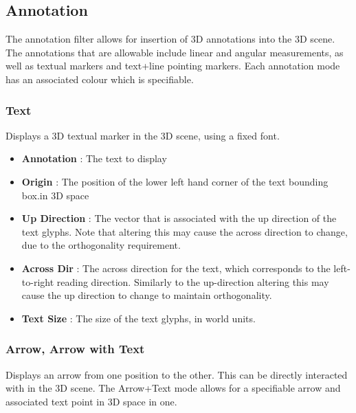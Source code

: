 \documentclass[10pt]{article}
\begin{document}
\subsection{Annotation}
The annotation filter allows for insertion of 3D annotations into the 3D scene. The annotations that are allowable include linear and angular measurements, as well as textual markers and text+line pointing markers. Each annotation mode has an associated colour which is specifiable. 

\subsubsection{Text}
Displays a 3D textual marker in the 3D scene, using a fixed font.
\begin{itemize}
\item \textbf{Annotation} : The text to display
\item \textbf{Origin} : The position of the lower left hand corner of the text bounding box.in 3D space
\item \textbf{Up Direction} : The vector that is associated with the up direction of the text glyphs. Note that altering this may cause the across direction to change, due to the orthogonality requirement.
\item \textbf{Across Dir} : The across direction for the text, which corresponds to the left-to-right reading direction. Similarly to the up-direction altering this may cause the up direction to change to maintain orthogonality.
\item \textbf{Text Size} : The size of the text glyphs, in world units.
\end{itemize}

\subsubsection{Arrow, Arrow with Text}
Displays an arrow from one position to the other. This can be directly interacted with in the 3D scene. The Arrow+Text mode allows for a specifiable arrow and associated text point in 3D space in one. 
\end{document}

